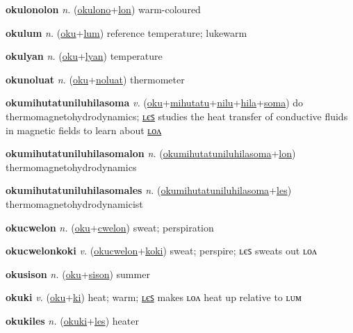 \textbf{\hypertarget{okulonolon}{okulonolon}} \textit{n.} (\hyperlink{okulono}{okulono}+\allowbreak \hyperlink{lon}{lon})
warm-coloured

\textbf{\hypertarget{okulum}{okulum}} \textit{n.} (\hyperlink{oku}{oku}+\allowbreak \hyperlink{lum}{lum})
reference temperature; lukewarm

\textbf{\hypertarget{okulyan}{okulyan}} \textit{n.} (\hyperlink{oku}{oku}+\allowbreak \hyperlink{lyan}{lyan})
temperature

\textbf{\hypertarget{okunoluat}{okunoluat}} \textit{n.} (\hyperlink{oku}{oku}+\allowbreak \hyperlink{noluat}{noluat})
thermometer

\textbf{\hypertarget{okumihutatuniluhilasoma}{okumihutatuniluhilasoma}} \textit{v.} (\hyperlink{oku}{oku}+\allowbreak \hyperlink{mihutatu}{mihutatu}+\allowbreak \hyperlink{nilu}{nilu}+\allowbreak \hyperlink{hila}{hila}+\allowbreak \hyperlink{soma}{soma})
do thermomagnetohydrodynamics; \hyperlink{okumihutatuniluhilasomales}{ʟєꜱ} studies the heat transfer of conductive fluids in magnetic fields to learn about \hyperlink{okumihutatuniluhilasomalon}{ʟᴏᴧ}

\textbf{\hypertarget{okumihutatuniluhilasomalon}{okumihutatuniluhilasomalon}} \textit{n.} (\hyperlink{okumihutatuniluhilasoma}{okumihutatuniluhilasoma}+\allowbreak \hyperlink{lon}{lon})
thermomagnetohydrodynamics

\textbf{\hypertarget{okumihutatuniluhilasomales}{okumihutatuniluhilasomales}} \textit{n.} (\hyperlink{okumihutatuniluhilasoma}{okumihutatuniluhilasoma}+\allowbreak \hyperlink{les}{les})
thermomagnetohydrodynamicist

\textbf{\hypertarget{okucwelon}{okucwelon}} \textit{n.} (\hyperlink{oku}{oku}+\allowbreak \hyperlink{cwelon}{cwelon})
sweat; perspiration

\textbf{\hypertarget{okucwelonkoki}{okucwelonkoki}} \textit{v.} (\hyperlink{okucwelon}{okucwelon}+\allowbreak \hyperlink{koki}{koki})
sweat; perspire; ʟєꜱ sweats out ʟᴏᴧ

\textbf{\hypertarget{okusison}{okusison}} \textit{n.} (\hyperlink{oku}{oku}+\allowbreak \hyperlink{sison}{sison})
summer

\textbf{\hypertarget{okuki}{okuki}} \textit{v.} (\hyperlink{oku}{oku}+\allowbreak \hyperlink{ki}{ki})
heat; warm; \hyperlink{okukiles}{ʟєꜱ} makes ʟᴏᴧ heat up relative to ʟᴜᴍ

\textbf{\hypertarget{okukiles}{okukiles}} \textit{n.} (\hyperlink{okuki}{okuki}+\allowbreak \hyperlink{les}{les})
heater

